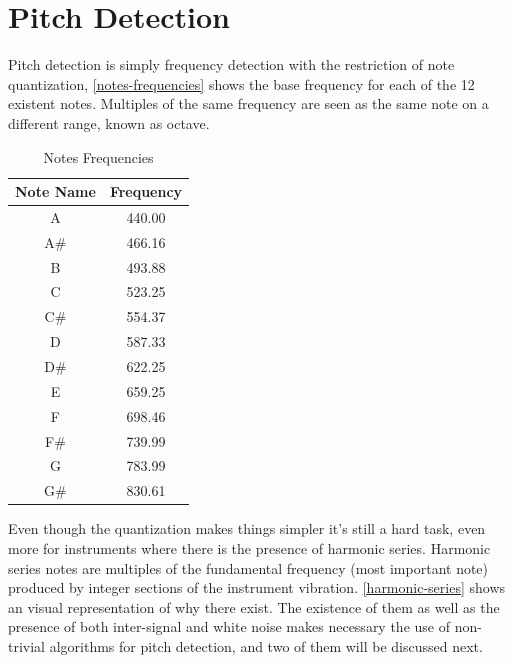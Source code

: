 \chapter{Pitch Detection}
\label{pitch-detection}

Pitch detection is simply frequency detection with the restriction of note quantization,
\autoref{notes-frequencies} shows the base frequency for each of the 12 existent
notes. Multiples of the same frequency are seen as the same note on a different
range, known as octave.

\begin{table}[htb]
  \begin{center}
    \ABNTEXreducedfont
    \caption[Notes Frequencies]{Notes Frequencies}
    \label{notes-frequencies}
    \begin{tabular}{c|c}
      \hline
      Note Name & Frequency\\
      \hline
      A & 440.00 \\
      A\# & 466.16 \\
      B & 493.88 \\
      C & 523.25 \\
      C\# & 554.37 \\
      D & 587.33 \\
      D\# & 622.25 \\
      E & 659.25 \\
      F & 698.46 \\
      F\# & 739.99 \\
      G & 783.99 \\
      G\# & 830.61 \\
      \hline
    \end{tabular}
  \end{center}
\end{table}

Even though the quantization makes things simpler it's still a hard task, even
more for instruments where there is the presence of harmonic series. Harmonic
series notes are multiples of the fundamental frequency (most important
note) produced by integer sections of the instrument vibration. \autoref{harmonic-series}
shows an visual representation of why there exist. The existence of them as well
as the presence of both inter-signal and white noise makes necessary the use of
non-trivial algorithms for pitch detection, and two of them will be discussed next.

